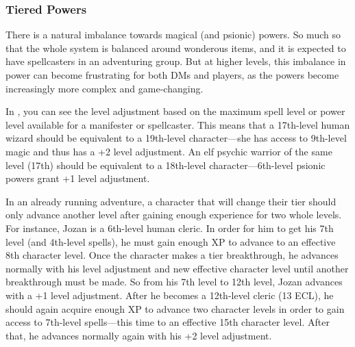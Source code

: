 \subsubsection{Tiered Powers}
There is a natural imbalance towards magical (and psionic) powers. So much so that the whole system is balanced around wonderous items, and it is expected to have spellcasters in an adventuring group. But at higher levels, this imbalance in power can become frustrating for both DMs and players, as the powers become increasingly more complex and game-changing.

In , you can see the level adjustment based on the maximum spell level or power level available for a manifester or spellcaster. This means that a 17th-level human wizard should be equivalent to a 19th-level character---she has access to 9th-level magic and thus has a +2 level adjustment. An elf psychic warrior of the same level (17th) should be equivalent to a 18th-level character---6th-level psionic powers grant +1 level adjustment.


In an already running adventure, a character that will change their tier should only advance another level after gaining enough experience for two whole levels. For instance, Jozan is a 6th-level human cleric. In order for him to get his 7th level (and 4th-level spells), he must gain enough XP to advance to an effective 8th character level. Once the character makes a tier breakthrough, he advances normally with his level adjustment and new effective character level until another breakthrough must be made. So from his 7th level to 12th level, Jozan advances with a +1 level adjustment. After he becomes a 12th-level cleric (13 ECL), he should again acquire enough XP to advance two character levels in order to gain access to 7th-level spells---this time to an effective 15th character level. After that, he advances normally again with his +2 level adjustment.